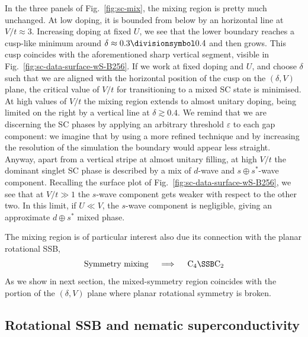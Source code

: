 In the three panels of Fig.~\ref{fig:sc-mix}, the mixing region is pretty much unchanged. At low doping, it is bounded from below by an horizontal line at $V/t \approx 3$. Increasing doping at fixed $U$, we see that the lower boundary reaches a cusp-like minimum around $\delta \approx 0.3 \divisionsymbol 0.4$ and then grows. This cusp coincides with the aforementioned sharp vertical segment, visible in Fig.~\ref{fig:sc-data-surface-wS-B256}. If we work at fixed doping and $U$, and choose $\delta$ such that we are aligned with the horizontal position of the cusp on the $(\delta,V)$ plane, the critical value of $V/t$ for transitioning to a mixed SC state is minimised. At high values of $V/t$ the mixing region extends to almost unitary doping, being limited on the right by a vertical line at $\delta \gtrsim 0.4$. We remind that we are discerning the SC phases by applying an arbitrary threshold $\varepsilon$ to each gap component: we imagine that by using a more refined technique and by increasing the resolution of the simulation the boundary would appear less straight. Anyway, apart from a vertical stripe at almost unitary filling, at high $V/t$ the dominant singlet SC phase is described by a mix of $d$-wave and $s \oplus s^*$-wave component. Recalling the surface plot of Fig.~\ref{fig:sc-data-surface-wS-B256}, we see that at $V/t \gg 1$ the $s$-wave component gets weaker with respect to the other two. In this limit, if $U \ll V$, the $s$-wave component is negligible, giving an approximate $d \oplus s^*$ mixed phase. 

The mixing region is of particular interest also due its connection with the planar rotational SSB,
\[
	\text{Symmetry mixing}
	\quad\implies\quad
	\mathrm{C}_4 \SSB \mathrm{C}_2
\]
As we show in next section, the mixed-symmetry region coincides with the portion of the $(\delta,V)$ plane where planar rotational symmetry is broken.

\subsection{Rotational SSB and nematic superconductivity}


